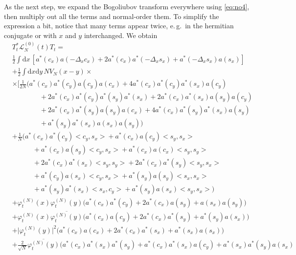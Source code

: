 \documentclass[11pt,a4paper,draft,DIV11]{scrartcl}	%
\newcommand{\di}{\textrm{d}}		%
\newcommand{\Lcal}{\mathcal{L}}		%
\newcommand{\scal}[2]{\big<#1,#2\big>} %
\newcommand{\cc}[1]{\overline{#1}}	%
\newcommand{\ph}{\varphi_t^{(N)}}	%
\newcommand{\tagg}[1]{ \stepcounter{equation} \tag{\theequation} \label{eq:#1} } %
\newcommand{\eqr}[1]{\eqref{eq:#1}}			%
\begin{document}
As the next step, we expand the Bogoliubov transform everywhere using \eqr{no4}, then multiply out all the terms and normal-order them. To simplify the expression a bit, notice that many terms appear twice, e.\,g.\ in the hermitian conjugate or with $x$ and $y$ interchanged. We obtain
\begin{align*}
& T^*_t \Lcal_N^{(0)}(t) T_t = \\ 
& \frac{1}{2} \int \di x\, \left[ a^*(c_x) a(-\Delta_x c_x) + \boxed{2 a^*(c_x) a^*(-\Delta_x s_x)} + a^*(-\Delta_x s_x) a(s_x) \right]\\%
& + \frac{1}{2}\int \di x \di y\, NV_N(x-y) \times \\
& \times \Big[   \frac{1}{2N}\bigg( a^*(c_x) a^*(c_y) a(c_y) a(c_x) + 4 a^*(c_x) a^*(c_y) a^*(s_x) a(c_y) \\
				      & \qquad\qquad + 2 a^*(c_x) a^*(c_y) a^*(s_y) a^*(s_x) + 2 a^*(c_x) a^*(s_x) a(s_y) a(c_y) \\
				      & \qquad\qquad + 2 a^*(c_x) a^*(s_y) a(s_y) a(c_x) + 4 a^*(c_x) a^*(s_y) a^*(s_x) a(s_y) \\
				      & \qquad\qquad + a^*(s_y) a^*(s_x) a(s_x) a(s_y) \bigg) \\
& + \frac{1}{N}\bigg(   \boxed{a^*(c_x)a^*(c_y) \scal{c_y}{s_x}} + a^*(c_x) a(c_y) \scal{s_y}{s_x}\\%
			& \qquad\quad + a^*(c_x) a(s_y) \scal{c_y}{s_x} + a^*(c_x) a(c_x) \scal{s_y}{s_y} \\
			& \qquad\quad + 2 a^*(c_x) a^*(s_x) \scal{s_y}{s_y} + 2a^*(c_x)a^*(s_y) \scal{s_y}{s_x} \\
			& \qquad\quad + a^*(c_y) a(s_x) \scal{c_y}{s_x} +  a^*(s_y) a(s_y) \scal{s_x}{s_x}\\
			& \qquad\quad + a^*(s_y) a^*(s_x) \scal{s_x}{c_y} + a^*(s_y) a(s_x) \scal{s_y}{s_x}   \bigg) \\
& + \ph(x)\ph(y) \Big( \boxed{a^*(c_x) a^*(c_y)} + 2 a^*(c_x) a(s_y) +a(s_x) a(s_y) \Big)\\%
& + \ph(x) \cc{\ph(y)} \Big( a^*(c_x) a(c_y) + 2 a^*(c_x) a^*(s_y) + a^*(s_y) a(s_x) \Big) \\
& + \lvert \ph(y) \rvert^2 \Big( a^*(c_x) a(c_x) + 2 a^*(c_x) a^*(s_x) + a^*(s_x) a(s_x) \Big) \\
& + \frac{2}{\sqrt{N}}\cc{\ph(y)} \bigg(    a^*(c_x) a^*(s_x) a^*(s_y) + a^*(c_x) a^*(s_x) a(c_y) + a^*(s_x) a^*(s_y) a(s_x)\\

\end{align*}
\end{document}
